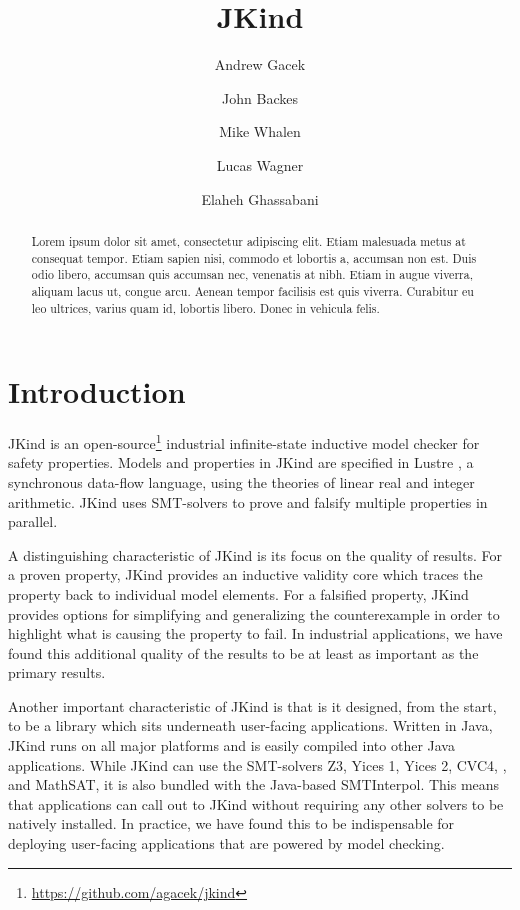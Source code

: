 \documentclass{llncs}
\title{JKind}
\author{
  Andrew Gacek\inst{1} \and
  John Backes\inst{2} \and
  Mike Whalen\inst{3} \and
  Lucas Wagner\inst{2} \and
  Elaheh Ghassabani\inst{3}}
\institute{
  Rockwell Collins \\
  \and
  Amazon Web Services \\
  \and
  University of Minnesota
}
\newcommand{\jkind}{{\sc JKind}\xspace}
\newcommand{\lustre}{{\sc Lustre}\xspace}
\begin{document}
\maketitle

\begin{abstract}
  Lorem ipsum dolor sit amet, consectetur adipiscing elit. Etiam
  malesuada metus at consequat tempor. Etiam sapien nisi, commodo et
  lobortis a, accumsan non est. Duis odio libero, accumsan quis
  accumsan nec, venenatis at nibh. Etiam in augue viverra, aliquam
  lacus ut, congue arcu. Aenean tempor facilisis est quis viverra.
  Curabitur eu leo ultrices, varius quam id, lobortis libero. Donec in
  vehicula felis.
\end{abstract}

\section{Introduction}

\jkind is an
open-source\footnote{\url{https://github.com/agacek/jkind}} industrial
infinite-state inductive model checker for safety properties. Models
and properties in \jkind are specified in \lustre
\cite{halbwachs1991ieee}, a synchronous data-flow language, using the
theories of linear real and integer arithmetic. \jkind uses
SMT-solvers to prove and falsify multiple properties in parallel.

A distinguishing characteristic of \jkind is its focus on the quality
of results. For a proven property, \jkind provides an inductive
validity core which traces the property back to individual model
elements. For a falsified property, \jkind provides options for
simplifying and generalizing the counterexample in order to highlight
what is causing the property to fail. In industrial applications, we
have found this additional quality of the results to be at least as
important as the primary results.

Another important characteristic of \jkind is that is it designed,
from the start, to be a library which sits underneath user-facing
applications. Written in Java, \jkind runs on all major platforms and
is easily compiled into other Java applications. While \jkind can use
the SMT-solvers {\sc Z3}, {\sc Yices 1}, {\sc Yices 2}, {\sc CVC4}, ,
and {\sc MathSAT}, it is also bundled with the Java-based {\sc
  SMTInterpol}. This means that applications can call out to \jkind
without requiring any other solvers to be natively installed. In
practice, we have found this to be indispensable for deploying
user-facing applications that are powered by model checking.
\end{document}
